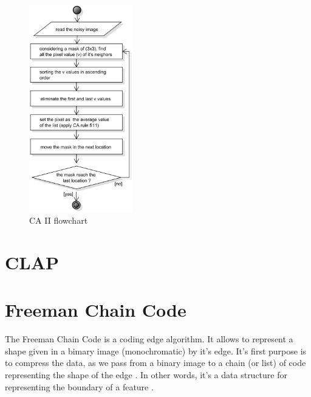 \begin{figure}[ht]
	\centering
	\includegraphics[width=0.4\textwidth]{images/diagrams/flowchart_CAII}
	\caption{CA II flowchart \cite{bib:filter:CA}}
	\label{fig:diagram:flowchart:CAII}
\end{figure}







\section{CLAP}


\cite{bib:filter:EdgeWithCLAP}







\section{Freeman Chain Code}



The Freeman Chain Code is a coding edge algorithm. It allows to represent a shape given in a bimary image (monochromatic) by it's edge. It's first purpose is to compress the data, as we pass from a binary image to a chain (or list) of code representing the shape of the edge \cite{bib:chain:ParametreGeometriqueChaineFreeman}. In other words, it's a data structure for representing the boundary of a feature \cite{bib:chain:DigitalImageProcessing}.

